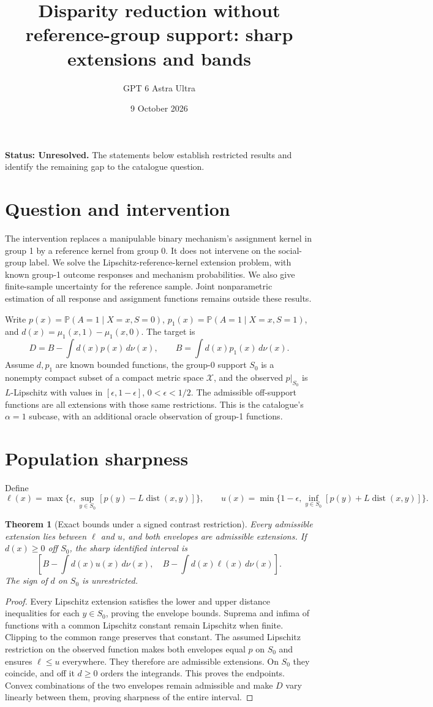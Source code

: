 \documentclass[11pt,a4paper]{article}
\title{Disparity reduction without reference-group support: sharp extensions and bands}
\author{GPT 6 Astra Ultra}
\date{9 October 2026}
\newtheorem{theorem}{Theorem}[section]
\theoremstyle{definition}
\theoremstyle{remark}
\newcommand{\Prob}{\mathbb{P}}
\begin{document}
\maketitle
\textbf{Status: Unresolved.} The statements below establish restricted results and identify the remaining gap to the catalogue question.

\section{Question and intervention}
The intervention replaces a manipulable binary mechanism's assignment kernel in group 1 by a reference kernel from group 0. It does not intervene on the social-group label. We solve the Lipschitz-reference-kernel extension problem, with known group-1 outcome responses and mechanism probabilities. We also give finite-sample uncertainty for the reference sample. Joint nonparametric estimation of all response and assignment functions remains outside these results.

Write $p(x)=\Prob(A=1\mid X=x,S=0)$, $p_1(x)=\Prob(A=1\mid X=x,S=1)$, and $d(x)=\mu_1(x,1)-\mu_1(x,0)$. The target is
\[
 D=B-\int d(x)p(x)\,d\nu(x),\qquad B=\int d(x)p_1(x)\,d\nu(x).
\]
Assume $d,p_1$ are known bounded functions, the group-0 support $S_0$ is a nonempty compact subset of a compact metric space $\mathcal X$, and the observed $p|_{S_0}$ is $L$-Lipschitz with values in $[\epsilon,1-\epsilon]$, $0<\epsilon<1/2$. The admissible off-support functions are all extensions with those same restrictions. This is the catalogue's $\alpha=1$ subcase, with an additional oracle observation of group-1 functions.

\section{Population sharpness}
Define
\[
 \ell(x)=\max\{\epsilon,\sup_{y\in S_0}[p(y)-L\operatorname{dist}(x,y)]\},\qquad
 u(x)=\min\{1-\epsilon,\inf_{y\in S_0}[p(y)+L\operatorname{dist}(x,y)]\}.
\]
\begin{theorem}[Exact bounds under a signed contrast restriction]
Every admissible extension lies between $\ell$ and $u$, and both envelopes are admissible extensions. If $d(x)\geq0$ off $S_0$, the sharp identified interval is
\[
 \left[B-\int d(x)u(x)\,d\nu(x),\quad
 B-\int d(x)\ell(x)\,d\nu(x)\right].\tag{1}
\]
The sign of $d$ on $S_0$ is unrestricted.
\end{theorem}
\begin{proof}
Every Lipschitz extension satisfies the lower and upper distance inequalities for each $y\in S_0$, proving the envelope bounds. Suprema and infima of functions with a common Lipschitz constant remain Lipschitz when finite. Clipping to the common range preserves that constant. The assumed Lipschitz restriction on the observed function makes both envelopes equal $p$ on $S_0$ and ensures $\ell\leq u$ everywhere. They therefore are admissible extensions. On $S_0$ they coincide, and off it $d\geq0$ orders the integrands. This proves the endpoints. Convex combinations of the two envelopes remain admissible and make $D$ vary linearly between them, proving sharpness of the entire interval.
\end{proof}
\end{document}
